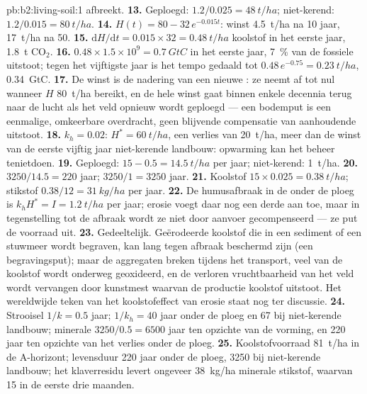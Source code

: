 \begin{solution}{pb:b2:living-soil:1}
afbreekt.
\textbf{13.} Geploegd: $1.2/0.025 = \qty{48}{t/ha}$; niet-kerend:
$1.2/0.015 = \qty{80}{t/ha}$.
\textbf{14.} $H(t) = 80 - 32\,e^{-0.015t}$: winst \qty{4.5}{t/ha}
na 10 jaar, \qty{17}{t/ha} na 50.
\textbf{15.} $\mathrm{d}H/\mathrm{d}t = 0.015\times 32 =
\qty{0.48}{t/ha}$ koolstof in het eerste jaar, \qty{1.8}{t}
$\mathrm{CO_2}$.
\textbf{16.} $0.48\times 1.5\times 10^{9} = \qty{0.7}{GtC}$ in het
eerste jaar, \qty{7}{\%} van de fossiele uitstoot; tegen het vijftigste jaar
is het tempo gedaald tot $0.48\,e^{-0.75} = \qty{0.23}{t/ha}$,
\qty{0.34}{GtC}.
\textbf{17.} De winst is de nadering van een nieuwe : ze
neemt af tot nul wanneer $H$ \qty{80}{t/ha} bereikt, en de hele winst gaat
binnen enkele decennia terug naar de lucht als het veld opnieuw wordt geploegd
--- een bodemput is een eenmalige, omkeerbare overdracht, geen blijvende
compensatie van aanhoudende uitstoot.
\textbf{18.} $k_h = 0.02$: $H^{*} = \qty{60}{t/ha}$, een verlies van
\qty{20}{t/ha}, meer dan de winst van de eerste vijftig jaar niet-kerende landbouw: opwarming kan het
beheer tenietdoen.
\textbf{19.} Geploegd: $15 - 0.5 = \qty{14.5}{t/ha}$ per jaar; niet-kerend:
\qty{1}{t/ha}.
\textbf{20.} $3250/14.5 = 220$ jaar; $3250/1 = 3250$ jaar.
\textbf{21.} Koolstof $15\times 0.025 = \qty{0.38}{t/ha}$; stikstof
$0.38/12 = \qty{31}{kg/ha}$ per jaar.
\textbf{22.} De humusafbraak in de  onder de ploeg is $k_hH^{*} =
I = \qty{1.2}{t/ha}$ per jaar; erosie voegt daar nog een derde aan toe,
maar in tegenstelling tot de afbraak wordt ze niet door aanvoer gecompenseerd
--- ze put de voorraad uit.
\textbf{23.} Gedeeltelijk. Geërodeerde koolstof die in een sediment of een
stuwmeer wordt begraven, kan lang tegen afbraak beschermd zijn (een
begravingsput); maar de aggregaten breken tijdens het transport, veel van de
koolstof wordt onderweg geoxideerd, en de verloren vruchtbaarheid van het veld
wordt vervangen door kunstmest waarvan de productie koolstof uitstoot. Het
wereldwijde teken van het koolstofeffect van erosie staat nog ter discussie.
\textbf{24.} Strooisel $1/k = 0.5$ jaar;  $1/k_h = 40$ jaar
onder de ploeg en 67 bij niet-kerende landbouw; minerale  $3250/0.5 =
6500$ jaar ten opzichte van de vorming, en 220 jaar ten opzichte van het
verlies onder de ploeg.
\textbf{25.} Koolstofvoorraad \qty{81}{t/ha} in de A-horizont; levensduur
220 jaar onder de ploeg, 3250 bij niet-kerende landbouw; het klaverresidu
levert ongeveer \qty{38}{kg/ha} minerale stikstof, waarvan 15 in de
eerste drie maanden.
\end{solution}
